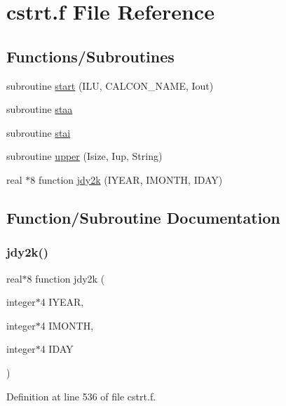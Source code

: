\hypertarget{cstrt_8f}{}\section{cstrt.\+f File Reference}
\label{cstrt_8f}
\subsection*{Functions/\+Subroutines}
\begin{DoxyCompactItemize}
\item 
subroutine \hyperlink{cstrt_8f_a5550f04f7873053b05b0ae19f16d2a91}{start} (I\+LU, C\+A\+L\+C\+O\+N\+\_\+\+N\+A\+ME, Iout)
\item 
subroutine \hyperlink{cstrt_8f_a5da3e664810d4e9fe357e1844112d700}{staa}
\item 
subroutine \hyperlink{cstrt_8f_ad365dc373957ba95ed3fde84a24fe241}{stai}
\item 
subroutine \hyperlink{cstrt_8f_acbfac21cd5532997f0d5b399227e19f3}{upper} (Isize, Iup, String)
\item 
real $\ast$8 function \hyperlink{cstrt_8f_ae9400eba603c3fbdbc509583be9221cd}{jdy2k} (I\+Y\+E\+AR, I\+M\+O\+N\+TH, I\+D\+AY)
\end{DoxyCompactItemize}


\subsection{Function/\+Subroutine Documentation}
\mbox{\label{cstrt_8f_ae9400eba603c3fbdbc509583be9221cd}} 
\subsubsection{\texorpdfstring{jdy2k()}{jdy2k()}}
{\footnotesize\ttfamily real$\ast$8 function jdy2k (\begin{DoxyParamCaption}\item[{integer$\ast$4}]{I\+Y\+E\+AR,  }\item[{integer$\ast$4}]{I\+M\+O\+N\+TH,  }\item[{integer$\ast$4}]{I\+D\+AY }\end{DoxyParamCaption})}



Definition at line 536 of file cstrt.\+f.



